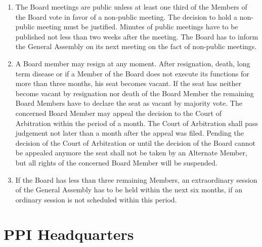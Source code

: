 \begin{frame}
\begin{enumerate}
\item The Board meetings are public unless at least one third of the Members of the Board vote in favor of a non-{}public meeting. The decision to hold a non-{}public meeting must be justified. Minutes of public meetings have to be published not less than two weeks after the meeting. The Board has to inform the General Assembly on its next meeting on the fact of non-{}public meetings.

\item A Board member may resign at any moment. After resignation, death, long term disease or if a Member of the Board does not execute its functions for more than three months, his seat becomes vacant. If the seat has neither become vacant by resignation nor death of the Board Member the remaining Board Members have to declare the seat as vacant by majority vote. The concerned Board Member may appeal the decision to the Court of Arbitration within the period of a month. The Court of Arbitration shall pass judgement not later than a month after the appeal was filed. Pending the decision of the Court of Arbitration or until the decision of the Board cannot be appealed anymore the seat shall not be taken by an Alternate Member, but all rights of the concerned Board Member will be suspended.

\item If the Board has less than three remaining Members, an extraordinary session of the General Assembly has to be held within the next six months, if an ordinary session is not scheduled within this period.

\end{enumerate}

\end{frame}

\section{PPI Headquarters}
\label{ppiheadquarters}


